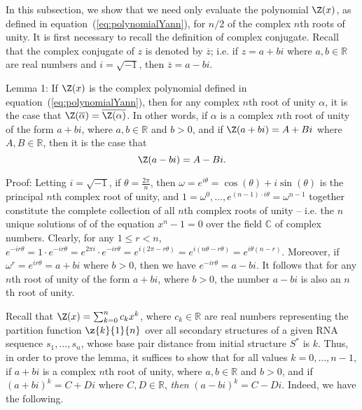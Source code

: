 In this subsection, we show that we need only evaluate the polynomial
$\Z(x)$, as defined in
equation~(\ref{eq:polynomialYann}), for $n/2$ of the complex $n$th roots
of unity. It is first necessary to recall the definition of complex
conjugate.
Recall that the complex conjugate of $z$ is denoted by $\overline{z}$;
i.e. if $z=a+bi$ where $a,b \in \mathbb{R}$ are real numbers and
$i = \sqrt{-1}$,  then $\overline{z} = a-bi$.
\smallskip

\noindent
{\sc Lemma 1:} If $\Z(x)$ is the complex polynomial defined in
equation~(\ref{eq:polynomialYann}), then for any complex $n$th root of
unity $\alpha$, it is the case that $\Z(\overline{\alpha}) =
\overline{\Z(\alpha)}$. In other words, if $\alpha$ is a complex $n$th root
of unity of the form $a+bi$, where $a,b \in \mathbb{R}$ and $b>0$, and
if $\Z(a+bi) = A + Bi$ where $A,B \in \mathbb{R}$, then it is the case that
\[
\Z(a - bi) = A - Bi.
\]
\smallskip

\noindent
{\sc Proof:}
Letting $i = \sqrt{-1}$, if  $\theta = \frac{2 \pi}{n}$, then
$\omega = e^{i \theta} = \cos(\theta) + i \sin(\theta)$
is the principal $n$th complex root of unity, and
$1=\omega^{0},\ldots,e^{(n-1)\cdot i \theta}=\omega^{n-1}$ together
constitute the complete collection of all
$n$th complex roots of unity -- i.e. the $n$ unique solutions of
of the equation $x^n -1 = 0$ over the field $\mathbb{C}$ of complex numbers.
Clearly, for any $1 \leq r < n$,
$e^{-i r \theta} = 1 \cdot e^{-i r \theta} =
e^{2 \pi i} \cdot e^{-i r \theta} = e^{i(2 \pi - r \theta)} =
e^{i(n \theta - r \theta)} = e^{i \theta (n - r)}$.
Moreover, if $\omega^r = e^{i r \theta} = a + b i$ where
$b>0$, then we have $e^{-i r \theta} = a-bi$. It follows that for any
$n$th root of unity of the form $a+bi$, where $b>0$, the number $a-bi$
is also an $n$th root of unity.

Recall that $\Z(x) = \sum_{k=0}^n c_k x^k$, where
$c_k\in \mathbb{R}$ are real numbers representing the partition function
$\z{k}{1}{n}$ over
all secondary structures of a given RNA sequence $s_1,\ldots,s_n$,
whose base pair distance from initial structure
$S^*$ is $k$. Thus, in order to prove the lemma, it suffices to show
that for all values $k=0,\ldots,n-1$, if $a+bi$ is a complex $n$th
root of unity, where $a,b \in \mathbb{R}$
and $b>0$, and if $(a+bi)^k = C+Di$ where $C,D \in \mathbb{R}$, {\em then}
$(a-bi)^k = C-Di$. Indeed, we have the following.

